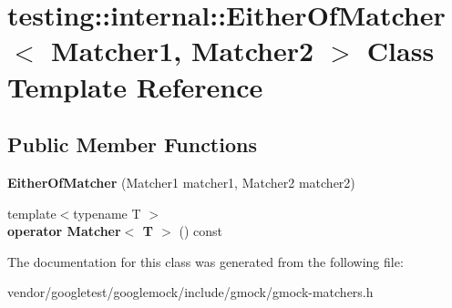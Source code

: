 \hypertarget{classtesting_1_1internal_1_1EitherOfMatcher}{}\section{testing\+:\+:internal\+:\+:Either\+Of\+Matcher$<$ Matcher1, Matcher2 $>$ Class Template Reference}
\label{classtesting_1_1internal_1_1EitherOfMatcher}
\subsection*{Public Member Functions}
\begin{DoxyCompactItemize}
\item 
{\bfseries Either\+Of\+Matcher} (Matcher1 matcher1, Matcher2 matcher2)\hypertarget{classtesting_1_1internal_1_1EitherOfMatcher_a5ae2361f20a0460870b72b83fcc0c643}{}\label{classtesting_1_1internal_1_1EitherOfMatcher_a5ae2361f20a0460870b72b83fcc0c643}

\item 
{\footnotesize template$<$typename T $>$ }\\{\bfseries operator Matcher$<$ T $>$} () const \hypertarget{classtesting_1_1internal_1_1EitherOfMatcher_acadc386ae63637fa408ee4d7154e9723}{}\label{classtesting_1_1internal_1_1EitherOfMatcher_acadc386ae63637fa408ee4d7154e9723}

\end{DoxyCompactItemize}


The documentation for this class was generated from the following file\+:\begin{DoxyCompactItemize}
\item 
vendor/googletest/googlemock/include/gmock/gmock-\/matchers.\+h\end{DoxyCompactItemize}
